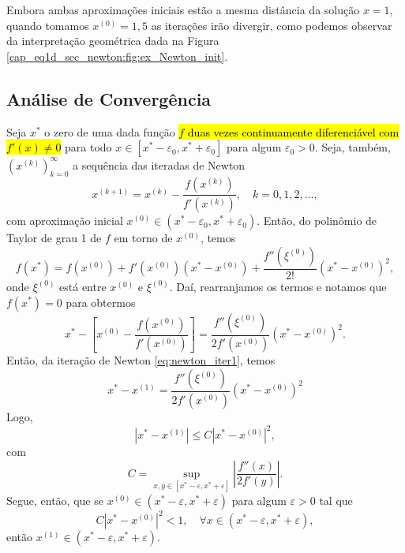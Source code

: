 \begin{ex}
Embora ambas aproximações iniciais estão a mesma distância da solução $x=1$, quando tomamos $x^{(0)}=1,5$ as iterações irão divergir, como podemos observar da interpretação geométrica dada na Figura \ref{cap_eq1d_sec_newton:fig:ex_Newton_init}.
\end{ex}

\subsection{Análise de Convergência}

Seja $x^*$ o zero de uma dada função \hl{$f$ duas vezes continuamente diferenciável com $f'(x)\neq 0$} para todo $x\in [x^*-\varepsilon_0, x^*+\varepsilon_0]$ para algum $\varepsilon_0>0$. Seja, também, $(x^{(k)})_{k=0}^\infty$ a sequência das iteradas de Newton
\begin{equation}\label{eq:newton_iter1}
  x^{(k+1)} = x^{(k)} - \frac{f(x^{(k)})}{f'(x^{(k)})},\quad k=0, 1, 2, \ldots,
\end{equation}
com aproximação inicial $x^{(0)}\in (x^*-\varepsilon_0, x^*+\varepsilon_0)$. Então, do polinômio de Taylor de grau 1 de $f$ em torno de $x^{(0)}$, temos
\begin{equation}
  f(x^*) = f(x^{(0)}) + f'(x^{(0)})(x^* - x^{(0)}) + \frac{f''(\xi^{(0)})}{2!}(x^*-x^{(0)})^2,
\end{equation}
onde $\xi^{(0)}$ está entre $x^{(0)}$ e $\xi^{(0)}$. Daí, rearranjamos os termos e notamos que $f(x^*)=0$ para obtermos
\begin{equation}
  x^* - \left[x^{(0)} - \frac{f(x^{(0)})}{f'(x^{(0)})}\right] = \frac{f''(\xi^{(0)})}{2f'(x^{(0)})}(x^*-x^{(0)})^2.
\end{equation}
Então, da iteração de Newton \eqref{eq:newton_iter1}, temos
\begin{equation}
  x^* - x^{(1)} = \frac{f''(\xi^{(0)})}{2f'(x^{(0)})}(x^* - x^{(0)})^2
\end{equation}
Logo,
\begin{equation}\label{eq:newton_taxa_1}
  |x^* - x^{(1)}| \leq C |x^* - x^{(0)}|^2,
\end{equation}
com
\begin{equation}
  C = \sup_{x,y\in [x^*-\varepsilon, x^*+\varepsilon]} \left|\frac{f''(x)}{2f'(y)}\right|.
\end{equation}
Segue, então, que se $x^{(0)}\in (x^*-\varepsilon, x^* + \varepsilon)$ para algum $\varepsilon>0$ tal que
\begin{equation}
  C |x^* - x^{(0)}|^2 < 1,\quad\forall x\in (x^*-\varepsilon, x^* + \varepsilon),
\end{equation}
então $x^{(1)}\in (x^*-\varepsilon, x^*+\varepsilon)$.

